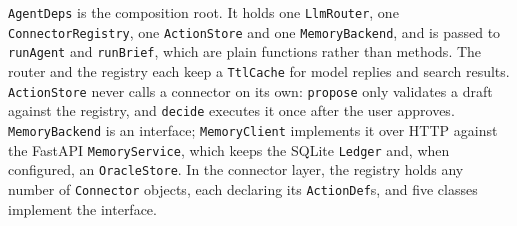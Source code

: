 \documentclass[oneside,a4paper,12pt]{report}
\begin{document}
\texttt{AgentDeps} is the composition root. It holds one \texttt{LlmRouter}, one \texttt{ConnectorRegistry}, one \texttt{ActionStore} and one \texttt{MemoryBackend}, and is passed to \texttt{runAgent} and \texttt{runBrief}, which are plain functions rather than methods. The router and the registry each keep a \texttt{TtlCache} for model replies and search results. \texttt{ActionStore} never calls a connector on its own: \texttt{propose} only validates a draft against the registry, and \texttt{decide} executes it once after the user approves. \texttt{MemoryBackend} is an interface; \texttt{MemoryClient} implements it over HTTP against the FastAPI \texttt{MemoryService}, which keeps the SQLite \texttt{Ledger} and, when configured, an \texttt{OracleStore}. In the connector layer, the registry holds any number of \texttt{Connector} objects, each declaring its \texttt{ActionDef}s, and five classes implement the interface.
\end{document}
